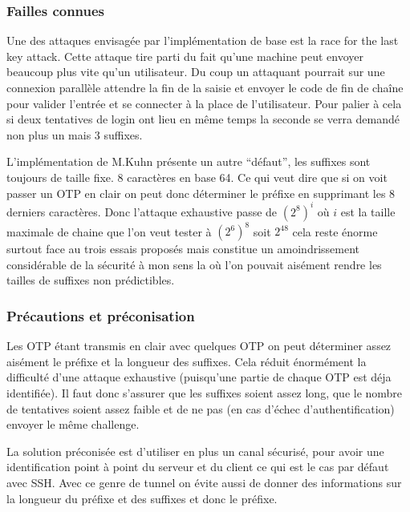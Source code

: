 \documentclass{../res/univ-projet}
\begin{document}
\subsubsection{Failles connues} 
        Une des attaques envisagée par l'implémentation de base est la race for the last key attack.
    Cette attaque tire parti du fait qu'une machine peut envoyer beaucoup plus vite qu'un utilisateur.
    Du coup un attaquant pourrait sur une connexion parallèle attendre la fin de la saisie et envoyer
    le code de fin de chaîne pour valider l'entrée et se connecter à la place de l'utilisateur.
    Pour palier à cela si deux tentatives de login ont lieu en même temps la seconde se verra demandé
    non plus un mais 3 suffixes.

        L'implémentation de M.Kuhn présente un autre ``défaut'', les suffixes sont toujours de taille fixe.
    8 caractères en base 64. Ce qui veut dire que si on voit passer un OTP en clair on peut donc déterminer le
    préfixe en supprimant les 8 derniers caractères. Donc l'attaque exhaustive passe de $(2^8)^i$ où $i$ est
    la taille maximale de chaine que l'on veut tester à $(2^6)^8$ soit $2^48$ cela reste énorme surtout
    face au trois essais proposés mais constitue un amoindrissement considérable de la sécurité à mon sens
    la où l'on pouvait aisément rendre les tailles de suffixes non prédictibles.

\subsubsection{Précautions et préconisation}
        Les OTP étant transmis en clair avec quelques OTP on peut déterminer assez
    aisément le préfixe et la longueur des suffixes. Cela réduit énormément la
    difficulté d'une attaque exhaustive (puisqu'une partie de chaque OTP est déja identifiée).
    Il faut donc s'assurer que les suffixes soient assez long, que le nombre de tentatives 
    soient assez faible et de ne pas (en cas d'échec d'authentification) envoyer le même challenge.


        La solution préconisée est d'utiliser en plus un canal sécurisé, pour avoir une 
    identification point à point du serveur et du client ce qui est le cas par défaut avec
    SSH. Avec ce genre de tunnel on évite aussi de donner des informations sur la longueur du préfixe
    et des suffixes et donc le préfixe. %
\end{document}
